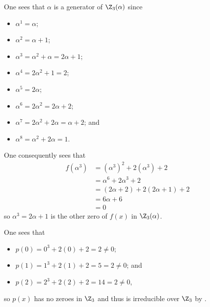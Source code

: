 \begin{questions}
    One sees that $\alpha$ is a generator of $\Z_3(\alpha)$ since
    \begin{multicols}{2}
        \begin{itemize}
            \item $\alpha^1 = \alpha$;
            \item $\alpha^2 = \alpha + 1$;
            \item $\alpha^3 = \alpha^2 + \alpha = 2\alpha + 1$;
            \item $\alpha^4 = 2\alpha^2 + 1 = 2$;
            \item $\alpha^5 = 2\alpha$;
            \item $\alpha^6 = 2\alpha^2 = 2\alpha + 2$;
            \item $\alpha^7 = 2\alpha^2 + 2\alpha = \alpha + 2$; and
            \item $\alpha^8 = \alpha^2 + 2\alpha = 1$.
        \end{itemize}
    \end{multicols}
    One consequently sees that
    \begin{align*}
        f(\alpha^3) &= (\alpha^3)^2 + 2(\alpha^3) + 2\\
        &= \alpha^6 + 2\alpha^3 + 2\\
        &= (2\alpha + 2) + 2(2\alpha + 1) + 2\\
        &= 6\alpha + 6\\
        &= 0
    \end{align*}
    so $\alpha^3 = 2\alpha + 1$ is the other zero of $f(x)$ in $\Z_3(\alpha)$.

    \item \begin{partquestions}{\roman*}
        \item One sees that
        \begin{itemize}
            \item $p(0) = 0^3 + 2(0) + 2 = 2 \neq 0$;
            \item $p(1) = 1^3 + 2(1) + 2 = 5 = 2 \neq 0$; and
            \item $p(2) = 2^3 + 2(2) + 2 = 14 = 2 \neq 0$,
        \end{itemize}
        so $p(x)$ has no zeroes in $\Z_3$ and thus is irreducible over $\Z_3$ by .
        

\end{partquestions}
\end{questions}
